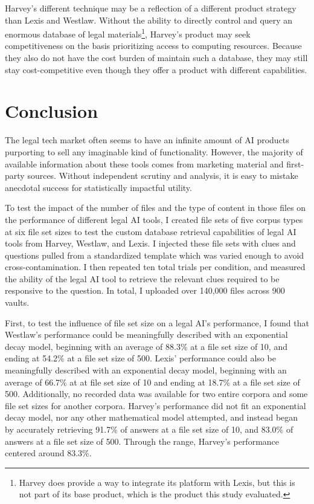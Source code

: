 \documentclass[
]{article}
\begin{document}
Harvey's different technique may be a reflection of a different product
strategy than Lexis and Westlaw. Without the ability to directly control
and query an enormous database of legal materials\footnote{Harvey does
  provide a way to integrate its platform with Lexis, but this is not
  part of its base product, which is the product this study evaluated.},
Harvey's product may seek competitiveness on the basis prioritizing
access to computing resources. Because they also do not have the cost
burden of maintain such a database, they may still stay cost-competitive
even though they offer a product with different capabilities.

\section{Conclusion}\label{conclusion}

The legal tech market often seems to have an infinite amount of AI
products purporting to sell any imaginable kind of functionality.
However, the majority of available information about these tools comes
from marketing material and first-party sources. Without independent
scrutiny and analysis, it is easy to mistake anecdotal success for
statistically impactful utility.

To test the impact of the number of files and the type of content in
those files on the performance of different legal AI tools, I created
file sets of five corpus types at six file set sizes to test the custom
database retrieval capabilities of legal AI tools from Harvey, Westlaw,
and Lexis. I injected these file sets with clues and questions pulled
from a standardized template which was varied enough to avoid
cross-contamination. I then repeated ten total trials per condition, and
measured the ability of the legal AI tool to retrieve the relevant clues
required to be responsive to the question. In total, I uploaded over
140,000 files across 900 vaults.

First, to test the influence of file set size on a legal AI's
performance, I found that Westlaw's performance could be meaningfully
described with an exponential decay model, beginning with an average of
88.3\% at a file set size of 10, and ending at 54.2\% at a file set size
of 500. Lexis' performance could also be meaningfully described with an
exponential decay model, beginning with an average of 66.7\% at at file
set size of 10 and ending at 18.7\% at a file set size of 500.
Additionally, no recorded data was available for two entire corpora and
some file set sizes for another corpora. Harvey's performance did not
fit an exponential decay model, nor any other mathematical model
attempted, and instead began by accurately retrieving 91.7\% of answers
at a file set size of 10, and 83.0\% of answers at a file set size of
500. Through the range, Harvey's performance centered around 83.3\%.
\end{document}
